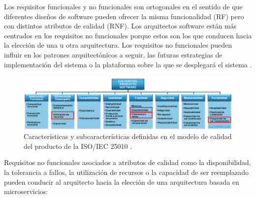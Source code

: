 \documentclass[11pt,spanish,listoffigures]{tfgetsinf}
\begin{document}
Los requisitos funcionales y no funcionales son ortogonales en el sentido de que diferentes diseños de software pueden ofrecer la misma funcionalidad (RF) pero con distintos atributos de calidad (RNF). Los arquitectos software están más centrados en los requisitos no funcionales porque estos son los que conducen hacia la elección de una u otra arquitectura. Los requisitos no funcionales pueden influir en los patrones arquitectónicos a seguir, las futuras estrategias de implementación del sistema o la plataforma sobre la que se desplegará el sistema \cite{Ameller2013}.

\begin{figure}[h]
\centering
\includegraphics[scale=0.5]{iso25010}
\caption{Características y subcaracterísticas definidas en el modelo de calidad del producto de la ISO/IEC 25010 \cite{Standard2010}.}
\end{figure}

Requisitos no funcionales asociados a atributos de calidad como la disponibilidad, la tolerancia a fallos, la utilización de recursos o la capacidad de ser reemplazado pueden conducir al arquitecto hacia la elección de una arquitectura basada en microservicios:
\end{document}
